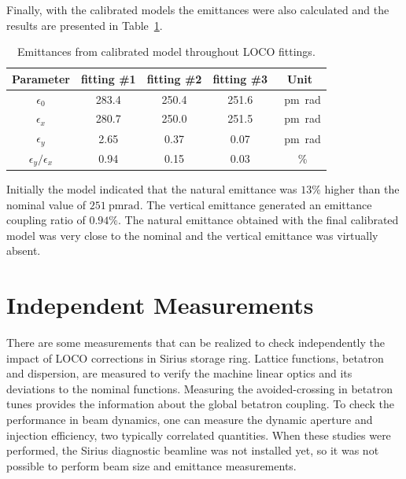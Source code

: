 Finally, with the calibrated models the emittances were also calculated and the results are presented in Table~\ref{tab:calibrated_emittances}.
\begin{table}[h!]
    \centering
    \caption{Emittances from calibrated model throughout LOCO fittings.}
    \label{tab:calibrated_emittances}
    \begin{tabular}{ccccc}
        \toprule\toprule
        Parameter & fitting \#1 & fitting \#2 & fitting \#3 & Unit \\
        \hline
        $\epsilon_0$ & \num{283.4} & \num{250.4} & \num{251.6} & \SI{}{\pico\meter\radian}  \\
        $\epsilon_x$ & \num{280.7} & \num{250.0} & \num{251.5} & \SI{}{\pico\meter\radian} \\
        $\epsilon_y$ &  \num{2.65} &  \num{0.37} & \num{0.07} & \SI{}{\pico\meter\radian}  \\
        $\epsilon_y/\epsilon_x$ &  \num{0.94} &  \num{0.15} & \num{0.03} & \SI{}{\%} \\
        \bottomrule\bottomrule
    \end{tabular}
\end{table}

Initially the model indicated that the natural emittance was $13\%$ higher than the nominal value of $\SI{251}{\pico\meter\radian}$. The vertical emittance generated an emittance coupling ratio of $0.94\%$. The natural emittance obtained with the final calibrated model was very close to the nominal and the vertical emittance was virtually absent.

\section{Independent Measurements}\label{sec:independent_meas}
There are some measurements that can be realized to check independently the impact of LOCO corrections in Sirius storage ring. Lattice functions, betatron and dispersion, are measured to verify the machine linear optics and its deviations to the nominal functions. Measuring the avoided-crossing in betatron tunes provides the information about the global betatron coupling. To check the performance in beam dynamics, one can measure the dynamic aperture and injection efficiency, two typically correlated quantities. When these studies were performed, the Sirius diagnostic beamline was not installed yet, so it was not possible to perform beam size and emittance measurements.

